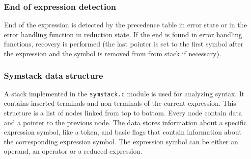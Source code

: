 \subsubsection{End of expression detection}
End of the expression is detected by the precedence table in error state or in the error handling function in reduction state. If the end is found in error handling functions, recovery is performed (the last pointer is set to the first symbol after the expression and the symbol is removed from from stack if necessary).


\subsubsection{Symstack data structure}
A stack implemented in the \verb|symstack.c| module is used for analyzing syntax. It contains inserted terminals and non-terminals of the current expression. This structure is a list of nodes linked from top to bottom. Every node contain data and a pointer to the previous node. The data stores information about a specific expression symbol, like a token, and basic flags that contain information about the corresponding expression symbol. The expression symbol can be either an operand, an operator or a reduced expression.  

